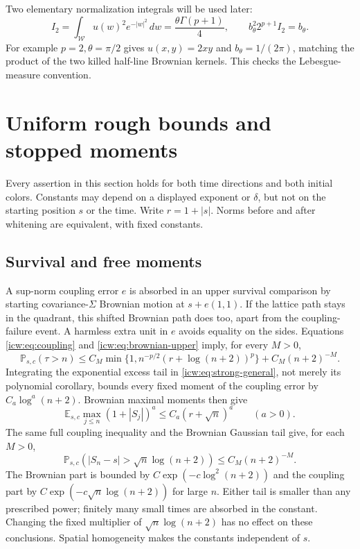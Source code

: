 \documentclass[11pt,letterpaper]{article}
\theoremstyle{remark}\newtheorem{remark}[theorem]{Remark}
\newcommand{\Prob}{\mathbb P}
\newcommand{\E}{\mathbb E}
\newcommand{\1}{\mathbf1}
\newcommand{\Wedge}{\mathcal W}
\begin{document}
Two elementary normalization integrals will be used later:
\begin{equation}\label{icw:eq:I2}
 I_2=\int_{\Wedge}u(w)^2e^{-|w|^2}\,dw
 =\frac{\theta\Gamma(p+1)}4,\qquad
 b_\theta^2 2^{p+1}I_2=b_\theta.
\end{equation}
For example $p=2,\theta=\pi/2$ gives $u(x,y)=2xy$ and
$b_\theta=1/(2\pi)$, matching the product of the two killed half-line
Brownian kernels. This checks the Lebesgue-measure convention.

\section{Uniform rough bounds and stopped moments}\label{icw:sec:rough}
Every assertion in this section holds for both time directions and both
initial colors. Constants may depend on a displayed exponent or $\delta$,
but not on the starting position $s$ or the time. Write $r=1+|s|$.
Norms before and after whitening are equivalent, with fixed constants.

\subsection{Survival and free moments}
A sup-norm coupling error $e$ is absorbed in an upper survival comparison
by starting covariance-$\Sigma$ Brownian motion at $s+e(1,1)$. If the
lattice path stays in the quadrant, this shifted Brownian path does too,
apart from the coupling-failure event. A harmless extra unit in $e$
avoids equality on the sides. Equations \eqref{icw:eq:coupling} and
\eqref{icw:eq:brownian-upper} imply, for every $M>0$,
\begin{equation}\label{icw:eq:rough-survival}
 \Prob_{s,c}(\tau>n)\le
 C_M\min\{1,n^{-p/2}(r+\log(n+2))^p\}+C_M(n+2)^{-M}.
\end{equation}
Integrating the exponential excess tail in \eqref{icw:eq:strong-general},
not merely its polynomial corollary, bounds every fixed moment of the
coupling error by $C_a\log^a(n+2)$. Brownian maximal moments then give
\begin{equation}\label{icw:eq:free-moments}
 \E_{s,c}\max_{j\le n}(1+|S_j|)^a\le C_a(r+\sqrt n)^a
 \qquad(a>0).
\end{equation}
The same full coupling inequality and the Brownian Gaussian tail give,
for each $M>0$,
\begin{equation}\label{icw:eq:free-tail}
 \Prob_{s,c}(|S_n-s|>\sqrt n\log(n+2))\le C_M(n+2)^{-M}.
\end{equation}
The Brownian part is bounded by $C\exp(-c\log^2(n+2))$ and the
coupling part by $C\exp(-c\sqrt n\log(n+2))$ for large $n$.
Either tail is smaller than any prescribed power; finitely many small
times are absorbed in the constant. Changing the fixed multiplier of
$\sqrt n\log(n+2)$ has no effect on these conclusions. Spatial
homogeneity makes the constants independent of $s$.
\end{document}
